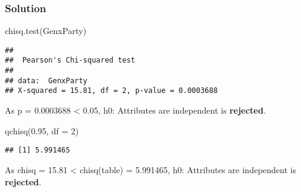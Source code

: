 \documentclass[
]{article}
\newenvironment{Shaded}{\begin{snugshade}}{\end{snugshade}}
\newcommand{\AttributeTok}[1]{\textcolor[rgb]{0.77,0.63,0.00}{#1}}
\newcommand{\DecValTok}[1]{\textcolor[rgb]{0.00,0.00,0.81}{#1}}
\newcommand{\FloatTok}[1]{\textcolor[rgb]{0.00,0.00,0.81}{#1}}
\newcommand{\FunctionTok}[1]{\textcolor[rgb]{0.00,0.00,0.00}{#1}}
\newcommand{\NormalTok}[1]{#1}
\begin{document}
\hypertarget{solution-27}{%
\subsubsection{Solution}\label{solution-27}}

\begin{Shaded}
\begin{Highlighting}[]
\FunctionTok{chisq.test}\NormalTok{(GenxParty)}
\end{Highlighting}
\end{Shaded}

\begin{verbatim}
## 
##  Pearson's Chi-squared test
## 
## data:  GenxParty
## X-squared = 15.81, df = 2, p-value = 0.0003688
\end{verbatim}

As p = 0.0003688 \textless{} 0.05, h0: Attributes are independent is
\textbf{rejected}.

\begin{Shaded}
\begin{Highlighting}[]
\FunctionTok{qchisq}\NormalTok{(}\FloatTok{0.95}\NormalTok{, }\AttributeTok{df =} \DecValTok{2}\NormalTok{)}
\end{Highlighting}
\end{Shaded}

\begin{verbatim}
## [1] 5.991465
\end{verbatim}

As chisq = 15.81 \textless{} chisq(table) = 5.991465, h0: Attributes are
independent is \textbf{rejected}.
\end{document}
